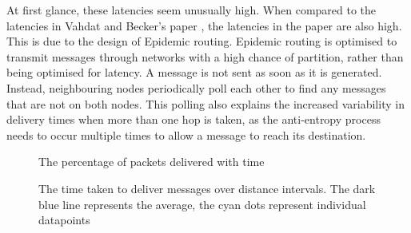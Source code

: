 \documentclass[12pt,a4paper]{report}
\begin{document}
At first glance, these latencies seem unusually high. When compared to the latencies in Vahdat and Becker's paper \cite{epidemic}, the latencies in the paper are also high. This is due to the design of Epidemic routing. Epidemic routing is optimised to transmit messages through networks with a high chance of partition, rather than being optimised for latency. A message is not sent as soon as it is generated. Instead, neighbouring nodes periodically poll each other to find any messages that are not on both nodes. This polling also explains the increased variability in delivery times when more than one hop is taken, as the anti-entropy process needs to occur multiple times to allow a message to reach its destination.
\begin{figure}[h]
\begin{center}

\end{center}
\caption{The percentage of packets delivered with time}
\end{figure}

\begin{figure}[h]
\begin{center}

\end{center}
\caption{The time taken to deliver messages over distance intervals. The dark blue line represents the average, the cyan dots represent individual datapoints}
\end{figure}
\begin{table}[h]
\begin{center}
\end{center}
\caption{Packet latency}
\end{table} 
\FloatBarrier
\end{document}

